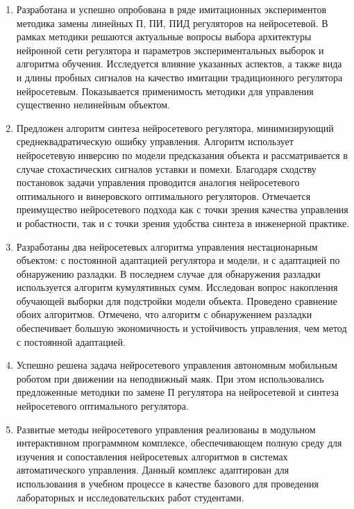 
\begin{enumerate}

\item Разработана и успешно опробована в ряде имитационных
  экспериментов методика замены линейных П, ПИ, ПИД регуляторов на
  нейросетевой.  В рамках методики решаются актуальные вопросы выбора
  архитектуры нейронной сети регулятора и параметров экспериментальных
  выборок и алгоритма обучения.  Исследуется влияние указанных
  аспектов, а также вида и длины пробных сигналов на качество имитации
  традиционного регулятора нейросетевым.  Показывается применимость
  методики для управления существенно нелинейным объектом.
\item Предложен алгоритм синтеза нейросетевого регулятора,
  минимизирующий среднеквадратическую ошибку управления.  Алгоритм
  использует нейросетевую инверсию по модели предсказания объекта и
  рассматривается в случае стохастических сигналов уставки и помехи.
  Благодаря сходству постановок задачи управления проводится аналогия
  нейросетевого оптимального и винеровского оптимального регуляторов.
  Отмечается преимущество нейросетевого подхода как с точки зрения
  качества управления и робастности, так и с точки зрения удобства
  синтеза в инженерной практике.
\item Разработаны два нейросетевых алгоритма управления нестационарным
  объектом: с постоянной адаптацией регулятора и модели, и с
  адаптацией по обнаружению разладки.  В последнем случае для
  обнаружения разладки используется алгоритм кумулятивных сумм.
  Исследован вопрос накопления обучающей выборки для подстройки модели
  объекта.  Проведено сравнение обоих алгоритмов.  Отмечено, что
  алгоритм с обнаружением разладки обеспечивает большую экономичность
  и устойчивость управления, чем метод с постоянной адаптацией.
\item Успешно решена задача нейросетевого управления автономным
  мобильным роботом при движении на неподвижный маяк.  При этом
  использовались предложенные методики по замене П регулятора на
  нейросетевой и синтеза нейросетевого оптимального регулятора.
\item Развитые методы нейросетевого управления реализованы в модульном
  интерактивном программном комплексе, обеспечивающем полную среду для
  изучения и сопоставления нейросетевых алгоритмов в системах
  автоматического управления.  Данный комплекс адаптирован для
  использования в учебном процессе в качестве базового для проведения
  лабораторных и исследовательских работ студентами.

\end{enumerate}
